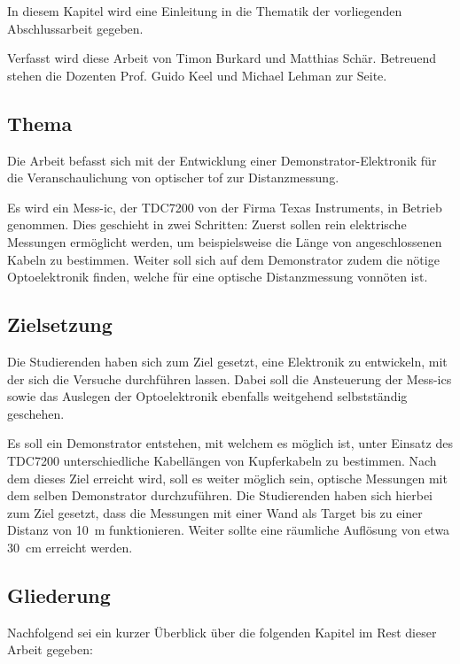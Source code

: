 In diesem Kapitel wird eine Einleitung in die Thematik der vorliegenden Abschlussarbeit gegeben.

Verfasst wird diese Arbeit von Timon Burkard und Matthias Schär. Betreuend stehen die Dozenten Prof. Guido Keel und
Michael Lehman zur Seite.

\subsection{Thema}
Die Arbeit befasst sich mit der Entwicklung einer Demonstrator-Elektronik für die Veranschaulichung von optischer \acrfull{tof} zur
Distanzmessung.

Es wird ein Mess-\acrshort{ic}, der TDC7200 von der Firma Texas Instruments, in Betrieb genommen. Dies geschieht in zwei
Schritten: Zuerst sollen rein elektrische Messungen ermöglicht werden, um beispielsweise die Länge von angeschlossenen
Kabeln zu bestimmen. Weiter soll sich auf dem Demonstrator zudem die nötige Optoelektronik finden, welche für eine
optische Distanzmessung vonnöten ist.

\subsection{Zielsetzung}
Die Studierenden haben sich zum Ziel gesetzt, eine Elektronik zu entwickeln, mit der sich die Versuche durchführen
lassen. Dabei soll die Ansteuerung der Mess-\acrshort{ic}s sowie das Auslegen der Optoelektronik ebenfalls weitgehend
selbstständig geschehen.

Es soll ein Demonstrator entstehen, mit welchem es möglich ist, unter Einsatz des TDC7200 unterschiedliche Kabellängen von
Kupferkabeln zu bestimmen. Nach dem dieses Ziel erreicht wird, soll es weiter möglich sein, optische Messungen mit dem
selben Demonstrator durchzuführen. Die Studierenden haben sich hierbei zum Ziel gesetzt, dass die Messungen mit einer Wand
als Target bis zu einer Distanz von 10~m funktionieren. Weiter sollte eine räumliche Auflösung von etwa 30~cm erreicht werden.

\subsection{Gliederung}
Nachfolgend sei ein kurzer Überblick über die folgenden Kapitel im Rest dieser Arbeit gegeben:


